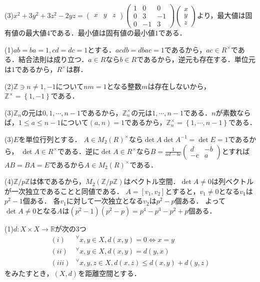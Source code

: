 \documentclass[
		book,
		head_space=20mm,
		foot_space=20mm,
		gutter=10mm,
		line_length=190mm
]{jlreq}
\begin{document}
(3)$x^2+3y^2+3z^2-2yz=\begin{pmatrix}
    x & y & z
\end{pmatrix}\begin{pmatrix}
    1 & 0 & 0\\
    0 & 3 & -1\\
    0 & -1 & 3
\end{pmatrix}\begin{pmatrix}
    x \\
    y \\
    z
\end{pmatrix}$より，最大値は固有値の最大値$4$である．最小値は固有値の最小値$1$である．

(1)$ab=ba=1,cd=dc=1$とする．$acdb=dbac=1$であるから，$ac\in R^{\times}$である．結合法則は成り立つ．$a\in R$なら$b \in R$であるから，逆元も存在する．単位元は$1$であるから，$R^{\times}$は群．

(2)$ \mathbb{Z}\ni n\neq 1,-1$について$nm=1$となる整数$m$は存在しないから，$\mathbb{Z}^{\times}= \left\{ 1,-1 \right\}$である．

(3)$\mathbb{Z}_n$の元は$0,1,\cdots,n-1$であるから，$\mathbb{Z}_n^{\times}$の元は$1,\cdots,n-1$である．$n$が素数ならば，$1\le a \le n-1$について$(a,n)=1$であるから，$\mathbb{Z}_n^{\times}=\left\{ 1,\cdots,n-1 \right\}$である．

(3)$E$を単位行列とする．
$A \in M_2(R)^{\times}$なら$\det A \det A^{-1}=\det E=1$であるから，
$\det A \in R^{\times}$である．逆に$\det A \in R^{\times}$なら$B=\frac{1}{ad-bc}\begin{pmatrix}
    d & -b\\
    -c & a
\end{pmatrix}$とすれば$AB=BA=E$であるから$A \in M_2(R)^{\times}$である．

(4)$\mathbb{Z}/p \mathbb{Z}$は体であるから，$M_2(\mathbb{Z}/p \mathbb{Z})$はベクトル空間．$\det A \neq 0$は列ベクトルが一次独立であることと同値である．
$A=[v_1,v_2]$とすると，$v_1 \neq 0$となる$v_1$は$p^2-1$個ある．
各$v_1$に対して一次独立となる$v_2$は$p^2-p$個ある．
よって$\det A \neq 0$となる$A$は$(p^2-1)(p^2-p)=p^4-p^3-p^2+p$個ある．

(1)$d\colon X\times X \rightarrow \mathbb{R}$が次の3つ
\begin{align}
(i) & {}^\forall x,y\in X ,d(x,y)=0\Leftrightarrow x=y\\
(ii) & {}^\forall x,y\in X ,d(x,y)=d(y,x)\\
(iii) & {}^\forall x,y,z\in X ,d(x,z)\le d(x,y)+d(y,z)
\end{align}
をみたすとき，$(X,d)$を距離空間とする．
\end{document}
